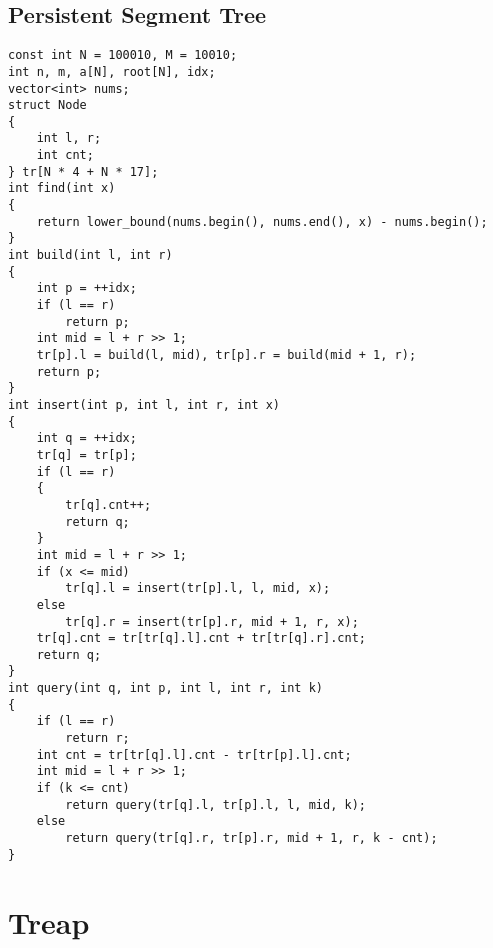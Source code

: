 \subsection{Persistent Segment Tree}
\begin{lstlisting}
const int N = 100010, M = 10010;
int n, m, a[N], root[N], idx;
vector<int> nums;
struct Node
{
    int l, r;
    int cnt;
} tr[N * 4 + N * 17];
int find(int x)
{
    return lower_bound(nums.begin(), nums.end(), x) - nums.begin();
}
int build(int l, int r)
{
    int p = ++idx;
    if (l == r)
        return p;
    int mid = l + r >> 1;
    tr[p].l = build(l, mid), tr[p].r = build(mid + 1, r);
    return p;
}
int insert(int p, int l, int r, int x)
{
    int q = ++idx;
    tr[q] = tr[p];
    if (l == r)
    {
        tr[q].cnt++;
        return q;
    }
    int mid = l + r >> 1;
    if (x <= mid)
        tr[q].l = insert(tr[p].l, l, mid, x);
    else
        tr[q].r = insert(tr[p].r, mid + 1, r, x);
    tr[q].cnt = tr[tr[q].l].cnt + tr[tr[q].r].cnt;
    return q;
}
int query(int q, int p, int l, int r, int k)
{
    if (l == r)
        return r;
    int cnt = tr[tr[q].l].cnt - tr[tr[p].l].cnt;
    int mid = l + r >> 1;
    if (k <= cnt)
        return query(tr[q].l, tr[p].l, l, mid, k);
    else
        return query(tr[q].r, tr[p].r, mid + 1, r, k - cnt);
}
\end{lstlisting}
\section{Treap}
\begin{lstlisting}

\end{lstlisting}